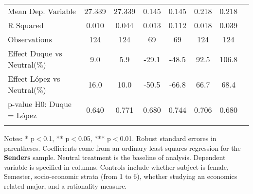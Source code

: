 \begin{table}[H]
{\begin{threeparttable}
\begin{tabular}{lccccccc}
\midrule
Mean Dep. Variable  &      27.339         &      27.339         &       0.145         &       0.145         &       0.218         &       0.218         \\
R Squared           &       0.010         &       0.044         &       0.013         &       0.112         &       0.018         &       0.039         \\
Observations        &         124         &         124         &          69         &          69         &         124         &         124         \\
\midrule
Effect Duque vs Neutral(\%)&         9.0         &         5.9         &       -29.1         &       -48.5         &        92.5         &       106.8         \\
Effect López vs Neutral(\%)&        16.0         &        10.0         &       -50.5         &       -66.8         &        66.7         &        68.4         \\
p-value H0: Duque = López&       0.640         &       0.771         &       0.680         &       0.744         &       0.706         &       0.680         \\
\bottomrule[0.5pt]                                                                               \label{tab:table2}                                                                       \end{tabular}                                                                                                    \vspace{-13pt}                                                                                           \begin{tablenotes}[flushleft]{\setlength{\itemindent}{-3pt}}          \small                                                                                                           \item Notes: * p$<$0.1, ** p$<$0.05, *** p$<$0.01. Robust standard errores in parentheses. Coefficients come from an ordinary least squares regression for the \textbf{Senders} sample. Neutral treatment is the baseline of analysis. Dependent variable is specified in columns. Controls include whether subject is female, Semester, socio-economic strata (from 1 to 6), whether studying an economics related major, and a rationality measure.          \end{tablenotes}                                                                                         \end{threeparttable}                                                                             }                                                                                                                        \end{table}
